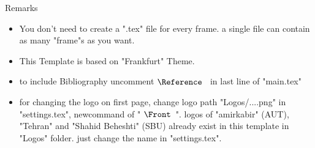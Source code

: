 \begin{frame}{Remarks}
\begin{itemize}
    \item You don't need to create a ".tex" file for every frame. a single file can contain as many "frame"s as you want.
    
    \item This Template is based on "Frankfurt" Theme.
    
    \item to include Bibliography uncomment $\texttt{\detokenize{\Reference}}$ in last line of "main.tex"

    \item for changing the logo on first page, change logo path "Logos/....png" in "settings.tex", newcommand of " $\texttt{\detokenize{\Front}}$". logos of "amirkabir" (AUT), "Tehran" and "Shahid Beheshti" (SBU) already exist in this template in "Logos" folder. just change the name in "settings.tex".
\end{itemize}
    
\end{frame}